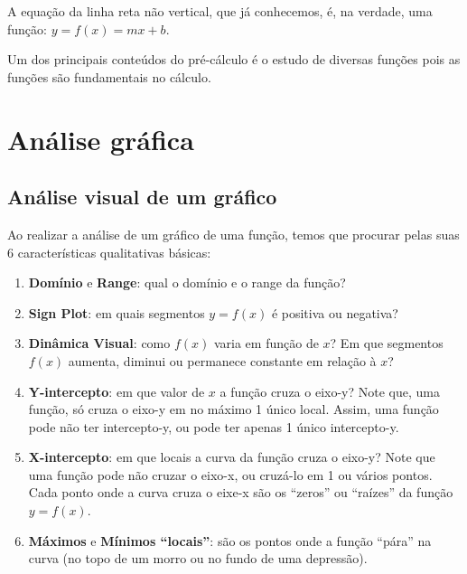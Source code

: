 \documentclass[pdftex, brazil, 12pt, twoside]{article}
\begin{document}
A equação da linha reta não vertical, que já conhecemos, é, na verdade,
uma função: $y = f(x) = mx + b$.

Um dos principais conteúdos do pré-cálculo é o estudo de diversas funções pois
as funções são fundamentais no cálculo.




\section{Análise gráfica}
\label{analise-grafica}

\subsection{Análise visual de um gráfico}
\label{analise-grafica-visual}

Ao realizar a análise de um gráfico de uma função, temos que procurar pelas suas
6 características qualitativas básicas:

\begin{enumerate}
\item \textbf{Domínio} e \textbf{Range}: qual o domínio e o range da função?
\item \textbf{Sign Plot}: em quais segmentos $y = f(x)$ é positiva ou negativa?
\item \textbf{Dinâmica Visual}: como $f(x)$ varia em função de $x$? Em que segmentos
  $f(x)$ aumenta, diminui ou permanece constante em relação à $x$?
\item \textbf{Y-intercepto}: em que valor de $x$ a função cruza o eixo-y? Note
  que, uma função, só cruza o eixo-y em no máximo 1 único local. Assim, uma função
  pode não ter intercepto-y, ou pode ter apenas 1 único intercepto-y.
\item \textbf{X-intercepto}: em que locais a curva da função cruza o eixo-y? Note
  que uma função pode não cruzar o eixo-x, ou cruzá-lo em 1 ou vários pontos. Cada
  ponto onde a curva cruza o eixe-x são os ``zeros'' ou ``raízes'' da função $y=f(x)$.
\item \textbf{Máximos} e \textbf{Mínimos ``locais''}: são os pontos onde a função ``pára''
  na curva (no topo de um morro ou no fundo de uma depressão).
\end{enumerate}
\end{document}

